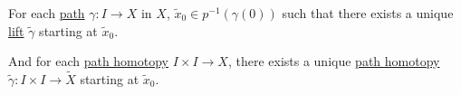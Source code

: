 \begin{corollary}\label{col:path-lifting-property}
	For each \hyperref[def:path]{path} \(\gamma \colon I\to X\) in \(X\), \(\widetilde{x} _0\in p^{-1} (\gamma (0)) \) such that there exists a
	unique \hyperref[prop:homotopy-lifting-property]{lift} \(\widetilde{\gamma} \) starting at \(\widetilde{x} _0\).

	\par And for each \hyperref[def:homotopy-path]{path homotopy} \(I\times I\to X\), there exists a unique \hyperref[def:homotopy-path]{path homotopy}
	\(\widetilde{\gamma} \colon I\times I\to \widetilde{X} \) starting at \(\widetilde{x}_0\).
	\begin{figure}[H]
		\centering
		\label{fig:col:lec14:1}
	\end{figure}
\end{corollary}
